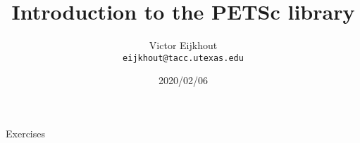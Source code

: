 \documentclass[11pt]{beamer}
\begin{document}
\title{Introduction to the PETSc library}
\author{Victor Eijkhout\\
\tt\normalsize eijkhout@tacc.utexas.edu}
\date{2020/02/06}
\frame{\titlepage}


\begin{xsede}
  
\end{xsede}

\begin{frame}{Exercises}
  \printindex[programming]
\end{frame}











\begin{longversion}
  
  
\end{longversion}


\end{document}

